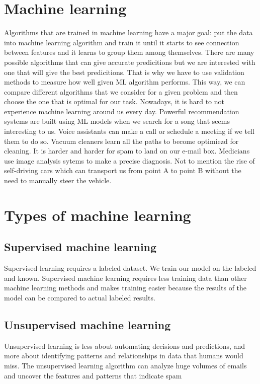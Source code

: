 \documentclass[a4paper,oneside,openright,11pt]{book}
\begin{document}
\section{Machine learning}

Algorithms that are trained in machine learning have a major goal: 
put the data into machine learning algorithm and train it until it starts to see connection between features and it learns to group them among themselves. There are many possible algorithms that can give accurate predicitions but we are interested with one that will give the best predicitions. That is why we have to use validation methods to measure how well given ML algorithm performs. This way, we can compare different algorithms that we consider for a given problem and then choose the one that is optimal for our task. Nowadays, it is hard to not experience machine learning around us every day. Powerful recommendation systems are built using ML models when we search for a song that seems interesting to us. Voice assistants can make a call or schedule a meeting if we tell them to do so. Vacuum cleaners learn all the paths to become optimiezd for cleaning. It is harder and harder for spam to land on our e-mail box. Medicians use image analysis sytems to make a precise diagnosis. Not to mention the rise of self-driving cars which can transport us from point A to point B without the need to manually steer the vehicle. 


\section{Types of machine learning}

\subsection{Supervised machine learning}

Supervised learning requires a labeled dataset. We train our model on the labeled and known. Supervised machine learning requires less training data than other machine learning methods and makes training easier because the results of the model can be compared to actual labeled results.



\subsection{Unsupervised machine learning}

Unsupervised learning is less about automating decisions and predictions, and more about identifying patterns and relationships in data that humans would miss. The unsupervised learning algorithm can analyze huge volumes of emails and uncover the features and patterns that indicate spam 
\end{document}
